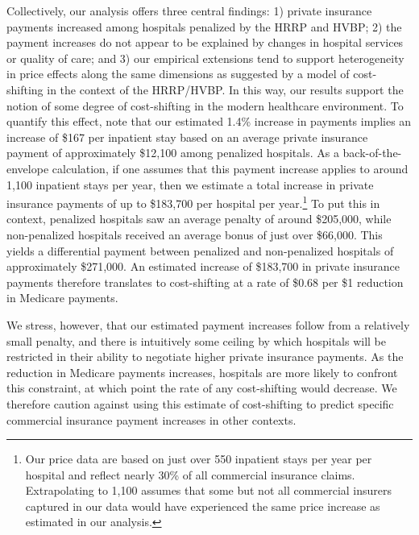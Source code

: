 \documentclass[12pt]{article}
\begin{document}
Collectively, our analysis offers three central findings: 1) private insurance payments increased among hospitals penalized by the HRRP and HVBP; 2) the payment increases do not appear to be explained by changes in hospital services or quality of care; and 3) our empirical extensions tend to support heterogeneity in price effects along the same dimensions as suggested by a model of cost-shifting in the context of the HRRP/HVBP. In this way, our results support the notion of some degree of cost-shifting in the modern healthcare environment. To quantify this effect, note that our estimated 1.4\% increase in payments implies an increase of \$167 per inpatient stay based on an average private insurance payment of approximately \$12,100 among penalized hospitals. As a back-of-the-envelope calculation, if one assumes that this payment increase applies to around 1,100 inpatient stays per year, then we estimate a total increase in private insurance payments of up to \$183,700 per hospital per year.\footnote{Our price data are based on just over 550 inpatient stays per year per hospital and reflect nearly 30\% of all commercial insurance claims. Extrapolating to 1,100 assumes that some but not all commercial insurers captured in our data would have experienced the same price increase as estimated in our analysis.} To put this in context, penalized hospitals saw an average penalty of around \$205,000, while non-penalized hospitals received an average bonus of just over \$66,000. This yields a differential payment between penalized and non-penalized hospitals of approximately \$271,000. An estimated increase of \$183,700 in private insurance payments therefore translates to cost-shifting at a rate of \$0.68 per \$1 reduction in Medicare payments.

We stress, however, that our estimated payment increases follow from a relatively small penalty, and there is intuitively some ceiling by which hospitals will be restricted in their ability to negotiate higher private insurance payments. As the reduction in Medicare payments increases, hospitals are more likely to confront this constraint, at which point the rate of any cost-shifting would decrease. We therefore caution against using this estimate of cost-shifting to predict specific commercial insurance payment increases in other contexts.
\end{document}
